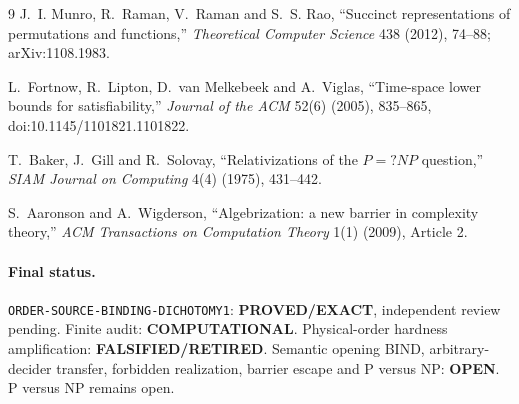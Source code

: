 \documentclass[11pt]{article}
\newcommand{\EXACT}{\textbf{PROVED/EXACT}}
\newcommand{\COMP}{\textbf{COMPUTATIONAL}}
\newcommand{\OPEN}{\textbf{OPEN}}
\newcommand{\RETIRED}{\textbf{FALSIFIED/RETIRED}}
\begin{document}
\begin{thebibliography}{9}
J.~I. Munro, R.~Raman, V.~Raman and S.~S. Rao,
``Succinct representations of permutations and functions,''
\emph{Theoretical Computer Science} 438 (2012), 74--88;
arXiv:1108.1983.

L.~Fortnow, R.~Lipton, D.~van Melkebeek and A.~Viglas,
``Time-space lower bounds for satisfiability,''
\emph{Journal of the ACM} 52(6) (2005), 835--865,
doi:10.1145/1101821.1101822.

T.~Baker, J.~Gill and R.~Solovay,
``Relativizations of the $P=?NP$ question,''
\emph{SIAM Journal on Computing} 4(4) (1975), 431--442.

S.~Aaronson and A.~Wigderson,
``Algebrization: a new barrier in complexity theory,''
\emph{ACM Transactions on Computation Theory} 1(1) (2009), Article 2.
\end{thebibliography}

\paragraph{Final status.}
\texttt{ORDER-SOURCE-BINDING-DICHOTOMY1}: \EXACT, independent review
pending.  Finite audit: \COMP.  Physical-order hardness amplification:
\RETIRED.  Semantic opening BIND, arbitrary-decider transfer, forbidden
realization, barrier escape and P versus NP: \OPEN.  P versus NP remains open.
\end{document}
